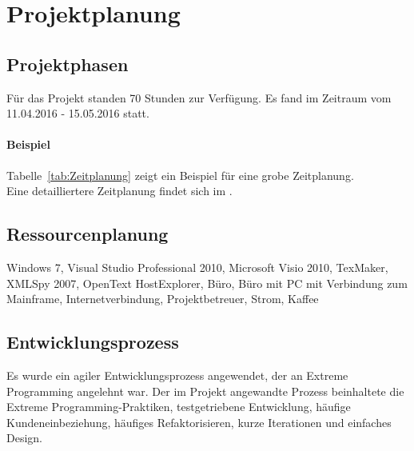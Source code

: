 \section{Projektplanung}
\label{sec:Projektplanung}


\subsection{Projektphasen}
\label{sec:Projektphasen}
Für das Projekt standen 70 Stunden zur Verfügung. Es fand im Zeitraum vom 11.04.2016 - 15.05.2016 statt.

\paragraph{Beispiel}
Tabelle~\ref{tab:Zeitplanung} zeigt ein Beispiel für eine grobe Zeitplanung.
\\
Eine detailliertere Zeitplanung findet sich im .


\subsection{Ressourcenplanung}
\label{sec:Ressourcenplanung}
Windows 7, Visual Studio Professional 2010, Microsoft Visio 2010, TexMaker, XMLSpy 2007, OpenText HostExplorer, Büro, Büro mit PC mit Verbindung zum Mainframe, Internetverbindung, Projektbetreuer, Strom, Kaffee


\subsection{Entwicklungsprozess}
\label{sec:Entwicklungsprozess}
Es wurde ein agiler Entwicklungsprozess angewendet, der an Extreme Programming angelehnt war. Der im Projekt angewandte Prozess beinhaltete die Extreme Programming-Praktiken, testgetriebene Entwicklung, häufige Kundeneinbeziehung, häufiges Refaktorisieren, kurze Iterationen und einfaches Design. 






